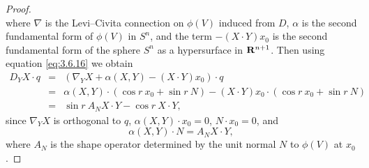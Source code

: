 \documentclass[10pt,a4paper]{amsart}
\begin{document}
\begin{proof}
\begin{equation}
\end{equation}
where $\nabla$ is the Levi--Civita connection on $\phi (V)$ induced from $D$, $\alpha$ is the second fundamental
form of $\phi (V)$ in $S^n$, and the term $- (X \cdot Y) x_0$ is the second fundamental
form of the sphere $S^n$ as a hypersurface in ${\bf R}^{n+1}$. 
Then using equation \eqref{eq:3.6.16} we obtain
\begin{eqnarray}
\label{eq:3.6.18}
D_Y X \cdot q &=& (\nabla_Y X + \alpha (X,Y) - (X \cdot Y) x_0) \cdot q \\
 &=& \alpha (X,Y) \cdot (\cos r\  x_0 + \sin r\  N) - (X \cdot Y) x_0 \cdot (\cos r\  x_0 + \sin r\  N) \nonumber \\
 &=& \sin r \ A_N X \cdot Y - \cos r \ X \cdot Y, \nonumber
\end{eqnarray}
since $\nabla_Y X$ is orthogonal to $q$, $\alpha (X,Y) \cdot x_0 = 0$, $N \cdot x_0 = 0$,  and 
\begin{displaymath}
\alpha (X,Y)\cdot N = A_N X \cdot Y,
\end{displaymath}
where $A_N$ is the shape operator
determined by the unit normal $N$ to $\phi (V)$ at $x_0$.


\end{proof}
\end{document}
